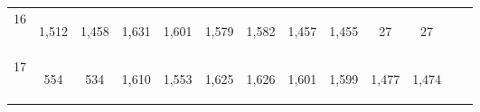 \begin{center}
\begin{tabular}{lcccccccccccc}
16 & \begin{bf}1,512\end{bf} & \begin{rm}1,458\end{rm} & \begin{bf}1,631\end{bf} & \begin{rm}1,601\end{rm} & \begin{bf}1,579\end{bf} & \begin{rm}1,582\end{rm} & \begin{bf}1,457\end{bf} & \begin{rm}1,455\end{rm} & \begin{bf}27\end{bf} & \begin{rm}27\end{rm} & \begin{bf}\end{bf} & \begin{rm}\end{rm}\\
17 & \begin{bf}554\end{bf} & \begin{rm}534\end{rm} & \begin{bf}1,610\end{bf} & \begin{rm}1,553\end{rm} & \begin{bf}1,625\end{bf} & \begin{rm}1,626\end{rm} & \begin{bf}1,601\end{bf} & \begin{rm}1,599\end{rm} & \begin{bf}1,477\end{bf} & \begin{rm}1,474\end{rm} & \begin{bf}\end{bf} & \begin{rm}\end{rm}\\

\end{tabular}
\end{center}
